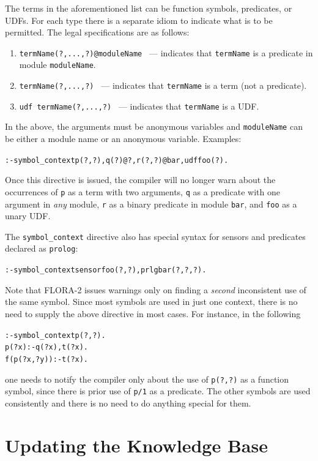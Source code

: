 \documentclass[11pt]{article}
\begin{document}
The terms in the aforementioned list can be function symbols, predicates,
or UDFs. For each type there is a separate idiom to indicate what is to be
permitted.
The legal specifications are as follows:
\begin{enumerate}
\item {\tt termName(?,...,?)@moduleName } --- indicates that
  \texttt{termName} is a predicate in module \texttt{moduleName}.  
\item {\tt termName(?,...,?) } --- indicates that \texttt{termName} is a
  term (not a predicate).
\item {\tt udf termName(?,...,?) } --- indicates that \texttt{termName}
  is a UDF.
\end{enumerate}
In the above, the arguments must be anonymous variables
and \texttt{moduleName} can be either a module name or an anonymous variable.
Examples:
\begin{alltt}
    :- symbol_context p(?,?), q(?)@?, r(?,?)@bar, udf foo(?).
\end{alltt}
Once this directive is issued, the compiler will no longer warn about the
occurrences of \texttt{p} as a term with two arguments, \texttt{q} as a
predicate with one argument in \emph{any} module, \texttt{r} as a binary
predicate in module \texttt{bar}, and \texttt{foo} as a unary UDF.      

The \texttt{symbol\_context} directive also
has special syntax for sensors and predicates declared as
\texttt{prolog}:
\begin{alltt}
   :- symbol_context sensor foo(?,?), prlg bar(?,?,?).
\end{alltt}

Note that FLORA-2 issues warnings only on finding a \emph{second}
inconsistent use of the same symbol. Since most symbols are used in just
one context, there is no need to supply the above directive  
in most cases. For instance, in the following
\begin{alltt}
    :- symbol_context p(?,?).
    p(?x):-q(?x), t(?x).
    f(p(?x,?y)):-t(?x).
\end{alltt}
one needs to notify the compiler only about the use of \texttt{p(?,?)} as a
function symbol, since there is prior use of \texttt{p/1} as a predicate.
The other symbols are used consistently and there is no need to do anything
special for them.
\begin{alltt}
\end{alltt}


\section{Updating the Knowledge Base}\label{sec-updates}
\end{document}
